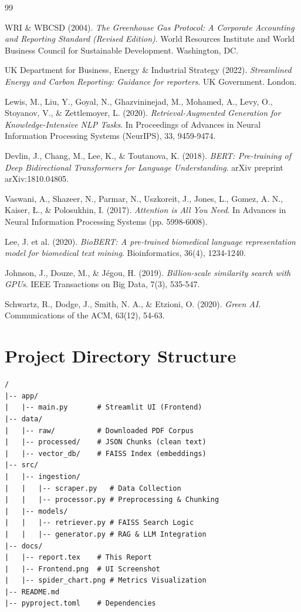 \documentclass[12pt, a4paper]{article}
\begin{document}
\begin{thebibliography}{99}

WRI \& WBCSD (2004). \textit{The Greenhouse Gas Protocol: A Corporate Accounting and Reporting Standard (Revised Edition)}. World Resources Institute and World Business Council for Sustainable Development. Washington, DC.

UK Department for Business, Energy \& Industrial Strategy (2022). \textit{Streamlined Energy and Carbon Reporting: Guidance for reporters}. UK Government. London.

Lewis, M., Liu, Y., Goyal, N., Ghazvininejad, M., Mohamed, A., Levy, O., Stoyanov, V., \& Zettlemoyer, L. (2020). \textit{Retrieval-Augmented Generation for Knowledge-Intensive NLP Tasks}. In Proceedings of Advances in Neural Information Processing Systems (NeurIPS), 33, 9459-9474.

Devlin, J., Chang, M., Lee, K., \& Toutanova, K. (2018). \textit{BERT: Pre-training of Deep Bidirectional Transformers for Language Understanding}. arXiv preprint arXiv:1810.04805.

Vaswani, A., Shazeer, N., Parmar, N., Uszkoreit, J., Jones, L., Gomez, A. N., Kaiser, Ł., \& Polosukhin, I. (2017). \textit{Attention is All You Need}. In Advances in Neural Information Processing Systems (pp. 5998-6008).

Lee, J. et al. (2020). \textit{BioBERT: A pre-trained biomedical language representation model for biomedical text mining}. Bioinformatics, 36(4), 1234-1240.

Johnson, J., Douze, M., \& Jégou, H. (2019). \textit{Billion-scale similarity search with GPUs}. IEEE Transactions on Big Data, 7(3), 535-547.

Schwartz, R., Dodge, J., Smith, N. A., \& Etzioni, O. (2020). \textit{Green AI}. Communications of the ACM, 63(12), 54-63.

\end{thebibliography}

\appendix
\section{Project Directory Structure}
\begin{verbatim}
/
|-- app/
|   |-- main.py       # Streamlit UI (Frontend)
|-- data/
|   |-- raw/          # Downloaded PDF Corpus
|   |-- processed/    # JSON Chunks (clean text)
|   |-- vector_db/    # FAISS Index (embeddings)
|-- src/
|   |-- ingestion/    
|   |   |-- scraper.py   # Data Collection
|   |   |-- processor.py # Preprocessing & Chunking
|   |-- models/       
|   |   |-- retriever.py # FAISS Search Logic
|   |   |-- generator.py # RAG & LLM Integration
|-- docs/
|   |-- report.tex    # This Report
|   |-- Frontend.png  # UI Screenshot
|   |-- spider_chart.png # Metrics Visualization
|-- README.md
|-- pyproject.toml    # Dependencies
\end{verbatim}
\end{document}
